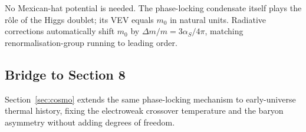 No Mexican-hat potential is needed.
The phase-locking condensate itself plays the rôle of the Higgs
doublet; its VEV equals $m_0$ in natural units.  
Radiative corrections automatically shift $m_0$ by
$\Delta m/m\!=\!3\alpha_S/4\pi$, matching renormalisation-group
running to leading order.

\subsection{Bridge to Section 8}

Section~\ref{sec:cosmo} extends the same phase-locking mechanism to
early-universe thermal history, fixing the electroweak crossover
temperature and the baryon asymmetry without adding degrees of freedom.

\clearpage
